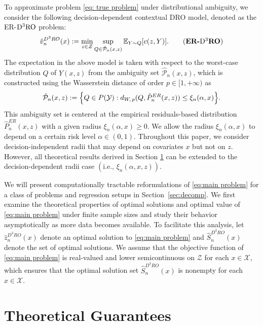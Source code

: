 \documentclass[onefignum,onetabnum]{siamart251216}
\begin{document}
To approximate problem \eqref{eq: true problem} under distributional ambiguity, we consider the following decision-dependent contextual DRO model, denoted as the ER-$\rm{D^3RO}$ problem: 
\vspace{-0.3cm}
\begin{equation}\label{eq:main problem}
 \hat{v}_n^{D^3RO}(x) := \min_{z \in \mathcal{Z}} \sup_{Q \in \hat{\mathcal{P}}_n(x,z)} \mathbb{E}_{Y \sim Q} [c(z,Y)]. 
 \tag{\textbf{ER-$\mathbf{\rm{D^3}}$RO}}
\end{equation}
The expectation in the above model is taken with respect to the worst-case distribution $Q$ of $Y(x,z)$ from the ambiguity set $\hat{\mathcal{P}}_n(x,z)$, which is constructed using the Wasserstein distance of order $p \in [1,+\infty)$ as \citep{esfahani2015data,gao2023distributionally}
    \begin{equation} \label{eq:wass as}
        \hat{\mathcal{P}}_n(x,z):=\Bigl\{Q \in P(\mathcal{Y}): d_{W,\, p} (Q,\hat{P}_n^{ER}(x,z))\leq \xi_n(\alpha,x)\Bigr\}.
    \end{equation}
This ambiguity set is centered at the empirical residuals-based distribution $\hat{P}_n^{ER}(x,z)$ with a given radius $\xi_n(\alpha,x) \geq 0$. 
We allow the radius $\xi_n(\alpha,x)$ to depend on a certain risk level $\alpha\in(0,1)$. Throughout this paper, we consider decision-independent radii that may depend on covariates $x$ but not on $z$. However, all theoretical results derived in Section \ref{section: Wasserstein} can be extended to the decision-dependent radii case $(\text{i.e., }\xi_n(\alpha,x,z))$.
  
  We will present computationally tractable reformulations of \eqref{eq:main problem} for a class of problems and regression setups in Section~\ref{sec:decomp}. We first examine the theoretical properties of optimal solutions and optimal value of \eqref{eq:main problem} under finite sample sizes and study their behavior asymptotically as more data becomes available. To facilitate this analysis, let $\hat{z}_n^{D^3RO}(x)$ denote an optimal solution to \eqref{eq:main problem} and $\hat{S}_n^{D^3RO}(x)$ denote the set of optimal solutions. We assume that the objective function of \eqref{eq:main problem} is real-valued and lower semicontinuous on $\mathcal{Z}$ for each $x \in \mathcal{X}$, which ensures that the optimal solution set $\hat{S}_n^{D^3RO}(x)$ is nonempty for each $x \in \mathcal{X}$.
 

\section{Theoretical Guarantees}
\label{section: Wasserstein}
\end{document}
